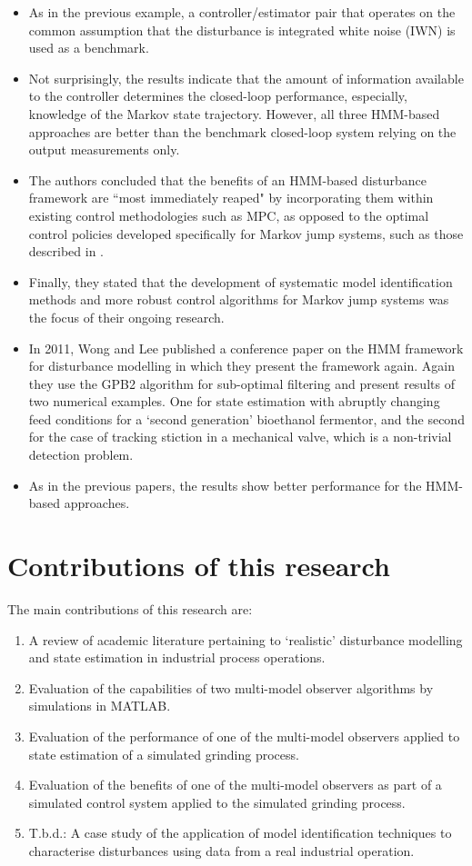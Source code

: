 \begin{itemize}
	\item As in the previous example, a controller/estimator pair that operates on the common assumption that the disturbance is integrated white noise (IWN) is used as a benchmark.
	\item Not surprisingly, the results indicate that the amount of information available to the controller determines the closed-loop performance, especially, knowledge of the Markov state trajectory. However, all three HMM-based approaches are better than the benchmark closed-loop system relying on the output measurements only.
	\item The authors concluded that the benefits of an HMM-based disturbance framework are ``most immediately reaped" by incorporating them within existing control methodologies such as MPC, as opposed to the optimal control policies developed specifically for Markov jump systems, such as those described in \cite{costa_discrete-time_2005}.
	\item Finally, they stated that the development of systematic model identification methods and more robust control algorithms for Markov jump systems was the focus of their ongoing research.
	\item In 2011, Wong and Lee published a conference paper on the HMM framework for disturbance modelling in which they present the framework again. Again they use the GPB2 algorithm for sub-optimal filtering and present results of two numerical examples. One for state estimation with abruptly changing feed conditions for a `second generation' bioethanol fermentor, and the second for the case of tracking stiction in a mechanical valve, which is a non-trivial detection problem.
	\item As in the previous papers, the results show better performance for the HMM-based approaches.
\end{itemize}


\section*{Contributions of this research}

The main contributions of this research are:

\begin{enumerate}
	\item A review of academic literature pertaining to `realistic' disturbance modelling and state estimation in industrial process operations.
	\item Evaluation of the capabilities of two multi-model observer algorithms by simulations in MATLAB.
	\item Evaluation of the performance of one of the multi-model observers applied to state estimation of a simulated grinding process.
	\item Evaluation of the benefits of one of the multi-model observers as part of a simulated control system applied to the simulated grinding process.
	\item T.b.d.: A case study of the application of model identification techniques to characterise disturbances using data from a real industrial operation.
\end{enumerate}

